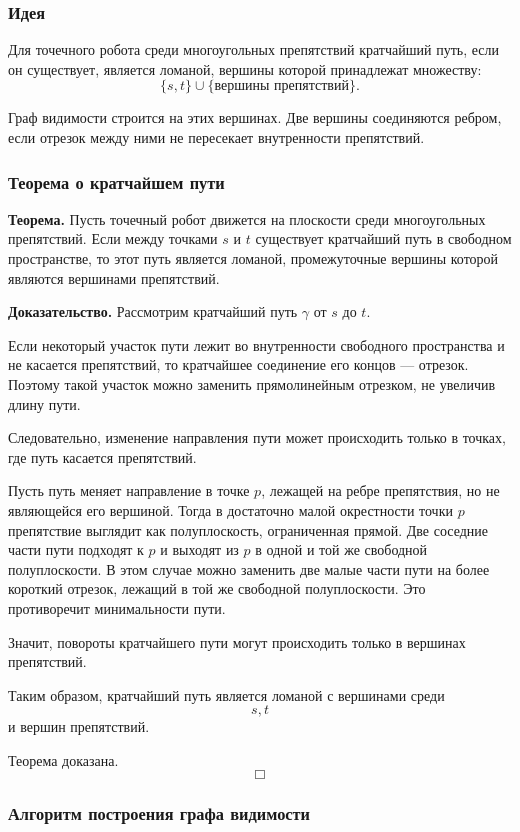 \documentclass[12pt,a4paper]{article}
\begin{document}
\subsubsection{Идея}

Для точечного робота среди многоугольных препятствий кратчайший путь, если он существует, является ломаной, вершины которой принадлежат множеству:
\[
\{s,t\}\cup\{\text{вершины препятствий}\}.
\]

Граф видимости строится на этих вершинах. Две вершины соединяются ребром, если отрезок между ними не пересекает внутренности препятствий.

\subsubsection{Теорема о кратчайшем пути}

\textbf{Теорема.}
Пусть точечный робот движется на плоскости среди многоугольных препятствий. Если между точками \(s\) и \(t\) существует кратчайший путь в свободном пространстве, то этот путь является ломаной, промежуточные вершины которой являются вершинами препятствий.

\textbf{Доказательство.}
Рассмотрим кратчайший путь \(\gamma\) от \(s\) до \(t\).

Если некоторый участок пути лежит во внутренности свободного пространства и не касается препятствий, то кратчайшее соединение его концов — отрезок. Поэтому такой участок можно заменить прямолинейным отрезком, не увеличив длину пути.

Следовательно, изменение направления пути может происходить только в точках, где путь касается препятствий.

Пусть путь меняет направление в точке \(p\), лежащей на ребре препятствия, но не являющейся его вершиной. Тогда в достаточно малой окрестности точки \(p\) препятствие выглядит как полуплоскость, ограниченная прямой. Две соседние части пути подходят к \(p\) и выходят из \(p\) в одной и той же свободной полуплоскости. В этом случае можно заменить две малые части пути на более короткий отрезок, лежащий в той же свободной полуплоскости. Это противоречит минимальности пути.

Значит, повороты кратчайшего пути могут происходить только в вершинах препятствий.

Таким образом, кратчайший путь является ломаной с вершинами среди
\[
s,t
\]
и вершин препятствий.

Теорема доказана.
\[
\Box
\]

\subsubsection{Алгоритм построения графа видимости}
\end{document}
